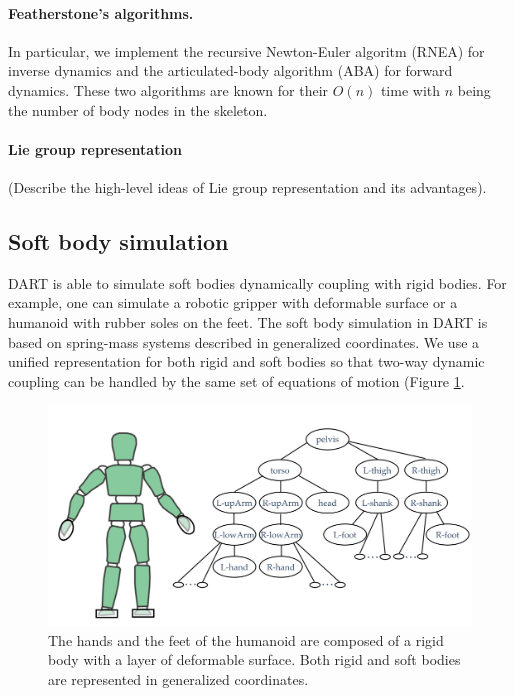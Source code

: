 \paragraph{Featherstone's algorithms.} In particular, we implement the
recursive Newton-Euler algoritm (RNEA) for inverse dynamics and the
articulated-body algorithm (ABA) for forward dynamics. These two
algorithms are known for their $O(n)$ time with $n$ being the number of
body nodes in the skeleton. 

\paragraph{Lie group representation}
 (Describe the high-level ideas of Lie group representation and its advantages).

\subsection{Soft body simulation}
DART is able to simulate soft bodies dynamically coupling with rigid
bodies. For example, one can simulate a robotic gripper with deformable
surface or a humanoid with rubber soles on the feet. The soft body
simulation in DART is based on spring-mass systems described in
generalized coordinates. We use a unified representation for both
rigid and soft bodies so that two-way dynamic coupling can be handled
by the same set of equations of motion (Figure \ref{fig:softbody}. 

\begin{figure}
\centering
\includegraphics[width=6.0in]{soft-body.jpg}
\caption{The hands and the feet of the humanoid are composed of a
  rigid body with a layer of deformable surface. Both rigid and soft
  bodies are represented in generalized coordinates.}
\label{fig:softbody}
\end{figure}

